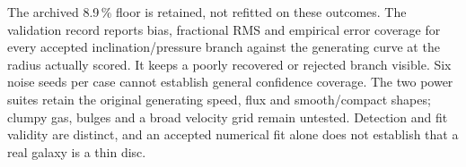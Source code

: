 The archived 8.9\,\% floor is retained, not refitted on these outcomes. The validation record reports bias, fractional RMS and empirical error coverage for every accepted inclination/pressure branch against the generating curve at the radius actually scored. It keeps a poorly recovered or rejected branch visible. Six noise seeds per case cannot establish general confidence coverage. The two power suites retain the original generating speed, flux and smooth/compact shapes; clumpy gas, bulges and a broad velocity grid remain untested. Detection and fit validity are distinct, and an accepted numerical fit alone does not establish that a real galaxy is a thin disc.
